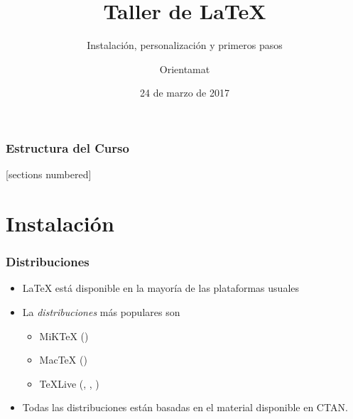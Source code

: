 \documentclass[10pt,xcolor=svgnames]{beamer}
\title{Taller de \LaTeX}
\subtitle{Instalación, personalización y primeros pasos}
\author{Orientamat}
\institute{Universidad de Granada}
\date[2017]{24 de marzo de 2017}
\begin{document}
\maketitle


\begin{frame}
\frametitle{Estructura del Curso}
  [sections numbered]
  \tableofcontents[hideallsubsections]
\end{frame}



\section{Instalación}

\begin{frame}
\frametitle{Distribuciones}
\begin{itemize}
\addtolength{\itemsep}{0.6\baselineskip}
\item \LaTeX{} está disponible en la mayoría de las plataformas usuales



\item La \emph{distribuciones} más populares son
	\medskip

	\begin{itemize}
	\addtolength{\itemsep}{0.5\baselineskip}
	\item MiK\TeX{} (\faWindows)
	\item Mac\TeX{} (\faApple)
	\item \TeX Live (\faApple, \faLinux, \faWindows)
	\end{itemize}

\item Todas las distribuciones están basadas en el material disponible en CTAN.	
\end{itemize}
\end{frame}
\end{document}
